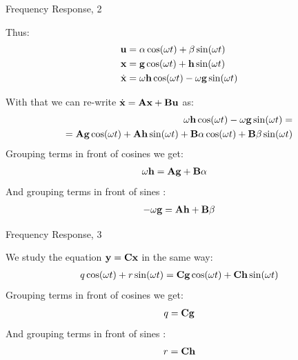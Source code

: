 \documentclass{beamer}
\begin{document}
\begin{frame}{Frequency Response, 2}
	\begin{flushleft}
		
		Thus:
		\begin{align}
			\mathbf{u} &= \alpha \cos(\omega t) + \beta \sin (\omega t)
			\\
			\mathbf{x}
			&= 
			\mathbf{g} \cos(\omega t) + \mathbf{h} \sin (\omega t)
			\\
			\dot{\mathbf{x}}
			&= 
			\omega \mathbf{h} \cos(\omega t) - \omega \mathbf{g} \sin (\omega t)
		\end{align}
		
		With that we can re-write $\dot{\mathbf{x}} = \mathbf{A}\mathbf{x} + \mathbf{B}\mathbf{u}$ as:
		\begin{align*}
			\omega \mathbf{h} \cos(\omega t) - \omega \mathbf{g} \sin (\omega t) 
			= \\
			 =\mathbf{A}\mathbf{g} \cos(\omega t) +  \mathbf{A}\mathbf{h} \sin (\omega t) 
			 + 
			 \mathbf{B}\alpha \cos(\omega t) + \mathbf{B} \beta \sin (\omega t)
		\end{align*}
		Grouping terms in front of cosines we get:
		\begin{align}
			\omega \mathbf{h} &= \mathbf{A} \mathbf{g} + \mathbf{B} \alpha
		\end{align}
		And grouping terms in front of sines :
		\begin{align}
				-\omega \mathbf{g} = \mathbf{A} \mathbf{h} + \mathbf{B} \beta
		\end{align}
		
		
	\end{flushleft}
\end{frame}



\begin{frame}{Frequency Response, 3}
	\begin{flushleft}
		
		We study the equation $\mathbf{y} = \mathbf{C}\mathbf{x}$ in the same way: 
		\begin{align}
			q \cos(\omega t) + r \sin (\omega t) 
			= 
			\mathbf{C}\mathbf{g} \cos(\omega t) + \mathbf{C}\mathbf{h} \sin (\omega t)
		\end{align}
		Grouping terms in front of cosines we get:
		\begin{align}
			q = \mathbf{C} \mathbf{g}
		\end{align}
		And grouping terms in front of sines :
		\begin{align}
			r = \mathbf{C} \mathbf{h}
		\end{align}
		
		
	\end{flushleft}
\end{frame}
\end{document}
